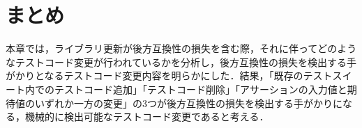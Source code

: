 \documentclass[11pt,dvipdfmx]{jreport}
\begin{document}

\section{まとめ}
本章では，ライブラリ更新が後方互換性の損失を含む際，それに伴ってどのようなテストコード変更が行われているかを分析し，後方互換性の損失を検出する手がかりとなるテストコード変更内容を明らかにした．結果，「既存のテストスイート内でのテストコード追加」「テストコード削除」「アサーションの入力値と期待値のいずれか一方の変更」の3つが後方互換性の損失を検出する手がかりになる，機械的に検出可能なテストコード変更であると考える．
\end{document}
